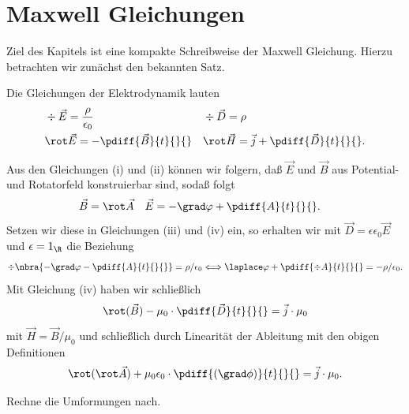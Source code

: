 \documentclass[../WiSe22ANA3.tex]{subfiles}
\begin{document}
		\section{Maxwell Gleichungen}
			Ziel des Kapitels ist eine kompakte Schreibweise der Maxwell Gleichung. Hierzu betrachten wir zunächst den bekannten Satz.
			\begin{info}
				Die \Maxwell Gleichungen der Elektrodynamik lauten
				\begin{align*}
					&\div\vec{E}=\frac{\rho}{\epsilon_0} &&\div\vec{D}=\rho \\
					&\rot\vec{E}=-\pdiff{\vec{B}}{t}{}{} &&\rot\vec{H}=\vec{j}+\pdiff{\vec{D}}{t}{}{}.
				\end{align*}
			\end{info}
			Aus den Gleichungen (i) und (ii) können wir folgern, daß $\vec E$ und $\vec B$ aus Potential- und Rotatorfeld konstruierbar sind, sodaß folgt
			\begin{align*}
				&\vec B=\rot\vec A &&\vec E=-\grad\varphi+\pdiff{A}{t}{}{}.
			\end{align*}
			Setzen wir diese in Gleichungen (iii) und (iv) ein, so erhalten wir mit $\vec D=\epsilon\epsilon_0\vec E$ und $\epsilon=1_\R$ die Beziehung
			$$\div\nbra{-\grad\varphi-\pdiff{A}{t}{}{}}=\rho/\epsilon_0\Longleftrightarrow\laplace\varphi+\pdiff{\div A}{t}{}{}=-\rho/\epsilon_0.$$
			Mit Gleichung (iv) haben wir schließlich 
			$$\rot(\vec B)-\mu_0\cdot\pdiff{\vec D}{t}{}{}=\vec j\cdot\mu_0$$
			mit $\vec H=\vec B/\mu_0$ und schließlich durch Linearität der Ableitung mit den obigen Definitionen
			$$\rot(\rot \vec A)+\mu_0\epsilon_0\cdot\pdiff{(\grad\phi)}{t}{}{}=\vec j\cdot\mu_0.$$
			\begin{Aufgabe}
				\nr Rechne die Umformungen nach. 
			\end{Aufgabe}
			
\end{document}
